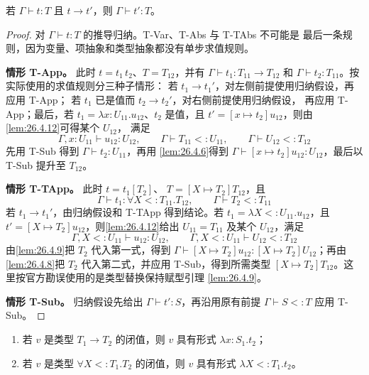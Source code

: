 \begin{theorem}[保持性]
\label{thm:26.4.13}
若 \(\Gamma\vdash t:T\) 且 \(t\longrightarrow t'\)，则
\(\Gamma\vdash t':T\)。
\end{theorem}

\begin{proof}
对 \(\Gamma\vdash t:T\) 的推导归纳。T-Var、T-Abs 与 T-TAbs 不可能是
最后一条规则，因为变量、项抽象和类型抽象都没有单步求值规则。

\textbf{情形 T-App。}
此时 \(t=t_1\,t_2\)、\(T=T_{12}\)，并有
\(\Gamma\vdash t_1:T_{11}\to T_{12}\) 和
\(\Gamma\vdash t_2:T_{11}\)。按实际使用的求值规则分三种子情形：
若 \(t_1\longrightarrow t_1'\)，对左侧前提使用归纳假设，再应用 T-App；
若 \(t_1\) 已是值而 \(t_2\longrightarrow t_2'\)，对右侧前提使用归纳假设，
再应用 T-App；最后，若
\(t_1=\lambda x:U_{11}.u_{12}\)、\(t_2\) 是值，且
\(t'=[x\mapsto t_2]u_{12}\)，则由\cref{lem:26.4.12}可得某个 \(U_{12}\)，
满足
\[
\Gamma,x:U_{11}\vdash u_{12}:U_{12},\qquad
\Gamma\vdash T_{11}<:U_{11},\qquad
\Gamma\vdash U_{12}<:T_{12}
\]
先用 T-Sub 得到 \(\Gamma\vdash t_2:U_{11}\)，再用
\cref{lem:26.4.6}得到
\(\Gamma\vdash[x\mapsto t_2]u_{12}:U_{12}\)，最后以 T-Sub 提升至
\(T_{12}\)。

\textbf{情形 T-TApp。}
此时 \(t=t_1[T_2]\)、
\(T=[X\mapsto T_2]T_{12}\)，且
\[
\Gamma\vdash t_1:\forall X<:T_{11}.T_{12},\qquad
\Gamma\vdash T_2<:T_{11}
\]
若 \(t_1\longrightarrow t_1'\)，由归纳假设和 T-TApp 得到结论。若
\(t_1=\lambda X<:U_{11}.u_{12}\)，且
\(t'=[X\mapsto T_2]u_{12}\)，则\cref{lem:26.4.12}给出
\(U_{11}=T_{11}\) 及某个 \(U_{12}\)，满足
\[
\Gamma,X<:U_{11}\vdash u_{12}:U_{12},\qquad
\Gamma,X<:U_{11}\vdash U_{12}<:T_{12}
\]
由\cref{lem:26.4.9}把 \(T_2\) 代入第一式，得到
\(\Gamma\vdash[X\mapsto T_2]u_{12}:[X\mapsto T_2]U_{12}\)；再由
\cref{lem:26.4.8}把 \(T_2\) 代入第二式，并应用 T-Sub，得到所需类型
\([X\mapsto T_2]T_{12}\)。这里按官方勘误使用的是类型替换保持赋型引理
\cref{lem:26.4.9}。

\textbf{情形 T-Sub。}
归纳假设先给出 \(\Gamma\vdash t':S\)，再沿用原有前提
\(\Gamma\vdash S<:T\) 应用 T-Sub。
\end{proof}

\taplstatementliststart
\begin{lemma}[典范形式]
\label{lem:26.4.14}
\taplstatementlistbreak
\begin{enumerate}
  \item 若 \(v\) 是类型 \(T_1\to T_2\) 的闭值，则 \(v\) 具有形式
        \(\lambda x:S_1.t_2\)；
  \item 若 \(v\) 是类型 \(\forall X<:T_1.T_2\) 的闭值，则 \(v\) 具有形式
        \(\lambda X<:T_1.t_2\)。
\end{enumerate}
\end{lemma}

